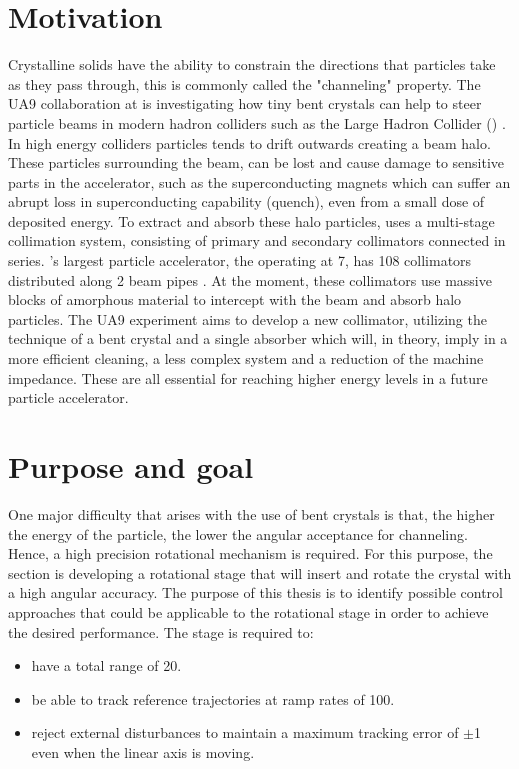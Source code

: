 \section{Motivation}
Crystalline solids have the ability to constrain the directions that particles take as they pass through, this is commonly called the "channeling" property. The UA9 collaboration at \abbrCERN is investigating how tiny bent crystals can help to steer particle beams in modern hadron colliders such as the Large Hadron Collider (\abbrLHC) \citep{WebsiteUA9:2016}. In high energy colliders particles tends to drift outwards creating a beam halo. These particles surrounding the beam, can be lost and cause damage to sensitive parts in the accelerator, such as the superconducting magnets which can suffer an abrupt loss in superconducting capability (quench), even from a small dose of deposited energy. To extract and absorb these halo particles, \abbrCERN uses a multi-stage collimation system, consisting of primary and secondary collimators connected in series. \abbrCERN's largest particle accelerator, the \abbrLHC operating at \unit{7}{\tera\electronvolt}, has 108 collimators distributed along 2 beam pipes \citep{CrystalCollimation:2015}. At the moment, these collimators use massive blocks of amorphous material to intercept with the beam and absorb halo particles. The UA9 experiment aims to develop a new collimator, utilizing the technique of a bent crystal and a single absorber which will, in theory, imply in a more efficient cleaning, a less complex system and a reduction of the machine impedance. These are all essential for reaching higher energy levels in a future particle accelerator.

\section{Purpose and goal}
One major difficulty that arises with the use of bent crystals is that, the higher the energy of the particle, the lower the angular acceptance for channeling. Hence, a high precision rotational mechanism is required. For this purpose, the \abbrECE section is developing a rotational stage that will insert and rotate the crystal with a high angular accuracy. The purpose of this thesis is to identify possible control approaches that could be applicable to the rotational stage in order to achieve the desired performance. The stage is required to:
\begin{itemize}
  \item have a total range of \unit{20}{\milli\rad}.
  \item be able to track reference trajectories at ramp rates of \unit{100}{\micro\radianpersecond}.
  \item reject external disturbances to maintain a maximum tracking error of $\pm$\unit{1}{\micro\rad} even when the linear axis is moving.
\end{itemize}
\newpage
